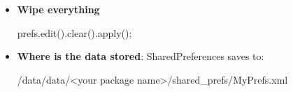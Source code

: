 \documentclass{report}
\begin{document}
\begin{itemize}
\begin{javacode}
            \end{javacode}
        \item \textbf{Wipe everything}
            \bigbreak \noindent 
            \begin{javacode}
                prefs.edit().clear().apply();
            \end{javacode}
        \item \textbf{Where is the data stored}: SharedPreferences saves to:
            \bigbreak \noindent 
            \begin{bashcode}
                /data/data/<your package name>/shared_prefs/MyPrefs.xml
            \end{bashcode}

    \end{itemize}

    \pagebreak 
\end{document}

